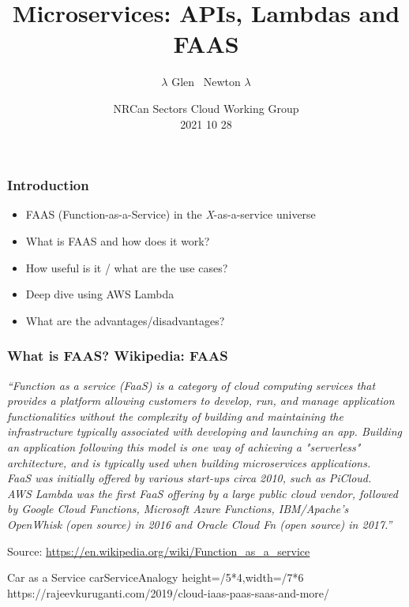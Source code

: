 \documentclass[11pt,aspectratio=169]{beamer}
\title[Crisis] %
{Microservices: APIs, Lambdas and FAAS}
\author[Newton] %
{$\lambda$ Glen ~Newton $\lambda$ }
\institute[Dept This and That] %
{
  Section Head, Scientific Computing\\
  Geological Survey of Canada\\
  Natural Resources Canada
}
\date[2021 10 28] %
     {NRCan Sectors Cloud Working Group\\
     2021 10 28}
\begin{document}
\nrcanTitleframe

  
\begin{nrcanFrame}
  \frametitle{Introduction}
  \begin{itemize}
  \item FAAS (Function-as-a-Service) in the \textit{X}-as-a-service universe
  \item What is FAAS and how does it work?
  \item How useful is it / what are the use cases?
  \item Deep dive using AWS Lambda
  \item What are the advantages/disadvantages?

    \end{itemize}
\end{nrcanFrame}

\begin{nrcanFrame}
  \frametitle{What is FAAS? Wikipedia: FAAS}
  \textit{``Function as a service (FaaS) is a category of cloud
    computing services that provides a platform allowing customers to
    develop, run, and manage application functionalities \alert{without the
    complexity of building and maintaining the infrastructure
    typically associated with developing and launching an app}.
    Building an application following this model is one way of
    achieving a "serverless" architecture, and is typically used when
    building \alert{microservices} applications.  
\\
      \vspace*{2mm}
      FaaS was initially offered by various start-ups circa 2010, such
      as PiCloud. 
      \\
\vspace{2mm}
AWS \alert{Lambda} was the first FaaS offering by a large public cloud
vendor, followed by Google \alert{Cloud Functions}, Microsoft \alert{Azure Functions},
IBM/Apache's OpenWhisk (open source) in 2016 and Oracle Cloud Fn (open
source) in 2017.'' 
}

  {\tiny Source: \url{https://en.wikipedia.org/wiki/Function_as_a_service}}
\end{nrcanFrame}
    
\nrcanGraphicFrame
  {Car as a Service}
  {carServiceAnalogy}
  {height=\paperheight/5*4,width=\paperwidth/7*6}
  {https://rajeevkuruganti.com/2019/cloud-iaas-paas-saas-and-more/}
\end{document}

